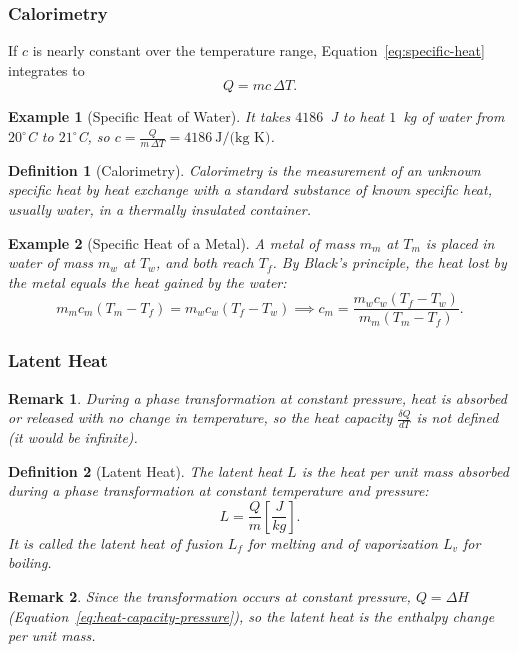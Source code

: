 \documentclass{article}
\newtheorem{definition}{Definition}
\newtheorem{example}{Example}
\newtheorem{remark}{Remark}
\begin{document}
\subsubsection{Calorimetry}
If $c$ is nearly constant over the temperature range, Equation~\eqref{eq:specific-heat} integrates to
\begin{equation}
    \label{eq:heat-mcdt}
    Q = mc\,\Delta T.
\end{equation}
\begin{example}[Specific Heat of Water]
    It takes $4186$~J to heat $1$~kg of water from $20^\circ$C to $21^\circ$C, so $c = \frac{Q}{m\,\Delta T} = 4186~\text{J/(kg K)}$.
\end{example}
\begin{definition}[Calorimetry]
    Calorimetry is the measurement of an unknown specific heat by heat exchange with a standard substance of known specific heat, usually water, in a thermally insulated container.
\end{definition}
\begin{example}[Specific Heat of a Metal]
    A metal of mass $m_m$ at $T_m$ is placed in water of mass $m_w$ at $T_w$, and both reach $T_f$. By Black's principle, the heat lost by the metal equals the heat gained by the water:
    \[m_m c_m (T_m - T_f) = m_w c_w (T_f - T_w) \implies c_m = \frac{m_w c_w (T_f - T_w)}{m_m (T_m - T_f)}.\]
\end{example}

\subsubsection{Latent Heat}
\begin{remark}
    During a phase transformation at constant pressure, heat is absorbed or released with no change in temperature, so the heat capacity $\frac{\delta Q}{dT}$ is not defined (it would be infinite).
\end{remark}
\begin{definition}[Latent Heat]
    The latent heat $L$ is the heat per unit mass absorbed during a phase transformation at constant temperature and pressure:
    \begin{equation}
        \label{eq:latent-heat}
        L=\frac{Q}{m}\left[\frac{J}{kg}\right].
    \end{equation}
    It is called the latent heat of fusion $L_f$ for melting and of vaporization $L_v$ for boiling.
\end{definition}
\begin{remark}
    Since the transformation occurs at constant pressure, $Q = \Delta H$ (Equation~\eqref{eq:heat-capacity-pressure}), so the latent heat is the enthalpy change per unit mass.
\end{remark}
\end{document}
